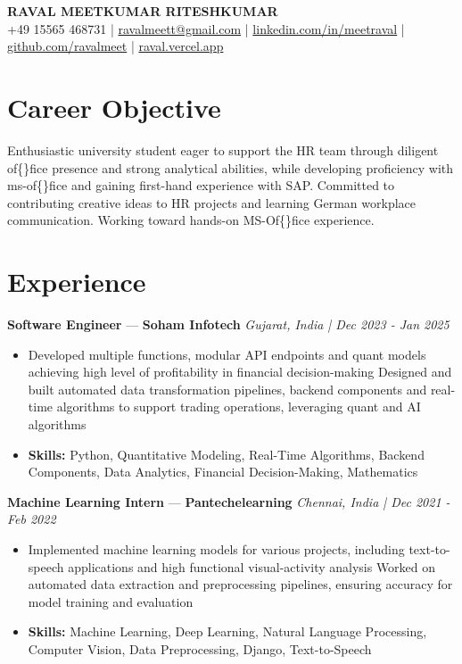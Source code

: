 \documentclass[a4paper,10pt]{article}
\begin{document}
\begin{center}
  {\Large\bfseries RAVAL MEETKUMAR RITESHKUMAR}\\[2pt]
  {\small +49 15565 468731 \;|\; \href{mailto:ravalmeett@gmail.com}{ravalmeett@gmail.com} \;|\; \href{https://www.linkedin.com/in/meetraval/}{linkedin.com/in/meetraval} \;|\; \href{https://github.com/ravalmeet}{github.com/ravalmeet} \;|\; \href{https://raval.vercel.app/}{raval.vercel.app}}
\end{center}
\vspace{-3pt}

\section*{Career Objective}
Enthusiastic university student eager to support the HR team through diligent of\{\}fice presence and strong analytical abilities, while developing proficiency with ms-of\{\}fice and gaining first-hand experience with SAP. Committed to contributing creative ideas to HR projects and learning German workplace communication. Working toward hands-on MS-Of\{\}fice experience.\par

\section*{Experience}
\textbf{Software Engineer} — \textbf{Soham Infotech} \hfill \textit{Gujarat, India \;|\; Dec 2023 - Jan 2025}\par
\vspace{1pt}
\begin{itemize}
  \item Developed multiple functions, modular API endpoints and quant models achieving high level of profitability in financial decision-making Designed and built automated data transformation pipelines, backend components and real-time algorithms to support trading operations, leveraging quant and AI algorithms
  \item \textbf{Skills:} Python, Quantitative Modeling, Real-Time Algorithms, Backend Components, Data Analytics, Financial Decision-Making, Mathematics
\end{itemize}
\vspace{3pt}
\textbf{Machine Learning Intern} — \textbf{Pantechelearning} \hfill \textit{Chennai, India \;|\; Dec 2021 - Feb 2022}\par
\vspace{1pt}
\begin{itemize}
  \item Implemented machine learning models for various projects, including text-to-speech applications and high functional visual-activity analysis Worked on automated data extraction and preprocessing pipelines, ensuring accuracy for model training and evaluation
  \item \textbf{Skills:} Machine Learning, Deep Learning, Natural Language Processing, Computer Vision, Data Preprocessing, Django, Text-to-Speech
\end{itemize}
\end{document}
